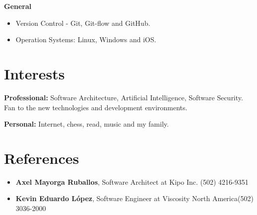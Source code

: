 \documentclass[]{friggeri-cv} %
\begin{document}
\textbf{General}
\begin{itemize}
	\item Version Control - Git, Git-flow and GitHub.
	\item Operation Systems: Linux, Windows and iOS.
\end{itemize}


\section{Interests}

\textbf{Professional:} Software Architecture, Artificial Intelligence, Software Security. Fan to the new technologies and development environments. 

\textbf{Personal:} Internet, chess, read, music and my family.

\section{References}

\begin{itemize}
	\item \noindent \textbf{Axel Mayorga Ruballos},  Software Architect at Kipo Inc. \hfill \hfill (502) 4216-9351
	\item \noindent \textbf{Kevin Eduardo López}, Software Engineer at Viscosity North America\hfill \hfill (502) 3036-2000
\end{itemize}
\end{document}
